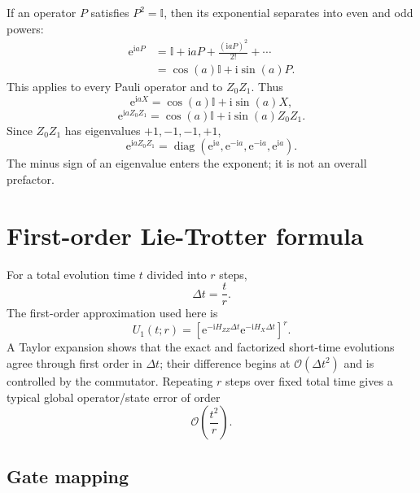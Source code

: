 \documentclass[11pt,a4paper]{article}
\newcommand{\I}{\mathbb{I}}
\newcommand{\e}{\mathrm{e}}
\newcommand{\ii}{\mathrm{i}}
\newcommand{\Order}{\mathcal{O}}
\begin{document}
If an operator $P$ satisfies $P^2=\I$, then its exponential separates into even and odd powers:
\begin{align}
\e^{\ii aP}
&=\I+\ii aP+\frac{(\ii aP)^2}{2!}+\cdots\\
&=\cos(a)\I+\ii\sin(a)P.
\end{align}
This applies to every Pauli operator and to $Z_0Z_1$. Thus
\begin{equation}
\e^{\ii aX}=\cos(a)\I+\ii\sin(a)X,
\end{equation}
\begin{equation}
\e^{\ii aZ_0Z_1}=\cos(a)\I+\ii\sin(a)Z_0Z_1.
\end{equation}
Since $Z_0Z_1$ has eigenvalues $+1,-1,-1,+1$,
\begin{equation}
\e^{\ii aZ_0Z_1}=\operatorname{diag}(\e^{\ii a},\e^{-\ii a},\e^{-\ii a},\e^{\ii a}).
\end{equation}
The minus sign of an eigenvalue enters the exponent; it is not an overall prefactor.

\section{First-order Lie-Trotter formula}

For a total evolution time $t$ divided into $r$ steps,
\begin{equation}
\Delta t=\frac{t}{r}.
\end{equation}
The first-order approximation used here is
\begin{equation}
\boxed{U_1(t;r)=\left[\e^{-\ii H_{ZZ}\Delta t}\e^{-\ii H_X\Delta t}\right]^r.}
\end{equation}
A Taylor expansion shows that the exact and factorized short-time evolutions agree through first order in $\Delta t$; their difference begins at $\Order(\Delta t^2)$ and is controlled by the commutator. Repeating $r$ steps over fixed total time gives a typical global operator/state error of order
\begin{equation}
\Order\left(\frac{t^2}{r}\right).
\end{equation}

\subsection{Gate mapping}
\end{document}
